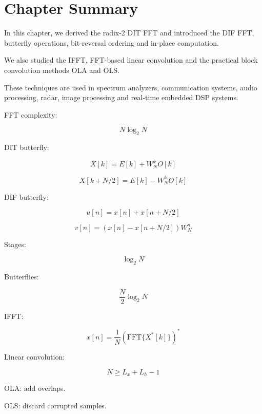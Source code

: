 
\section{Chapter Summary}

In this chapter, we derived the radix-2 DIT FFT and introduced the DIF FFT,
butterfly operations, bit-reversal ordering and in-place computation.

We also studied the IFFT, FFT-based linear convolution and the practical block
convolution methods OLA and OLS.

These techniques are used in spectrum analyzers, communication systems, audio
processing, radar, image processing and real-time embedded DSP systems.


\begin{tcolorbox}[title=One-Minute Revision,colback=blue!5]

FFT complexity:

\[
N\log_2N
\]

DIT butterfly:

\[
X[k]=E[k]+W_N^kO[k]
\]

\[
X[k+N/2]=E[k]-W_N^kO[k]
\]

DIF butterfly:

\[
u[n]=x[n]+x[n+N/2]
\]

\[
v[n]=(x[n]-x[n+N/2])W_N^n
\]

Stages:

\[
\log_2N
\]

Butterflies:

\[
\frac{N}{2}\log_2N
\]

IFFT:

\[
x[n]=
\frac{1}{N}
\left(
\text{FFT}\{X^*[k]\}
\right)^*
\]

Linear convolution:

\[
N\ge L_x+L_h-1
\]

OLA: add overlaps.

OLS: discard corrupted samples.

\end{tcolorbox}
